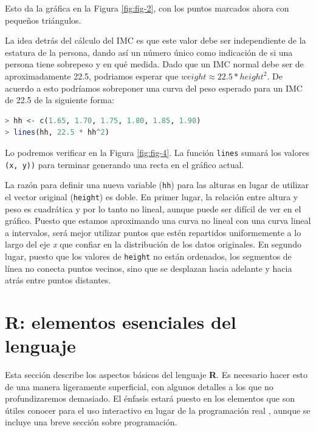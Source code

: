\documentclass[spanish]{extbook}
\numberwithin{equation}{section}
\numberwithin{figure}{section}
\begin{document}
Esto da la gráfica en la Figura \ref{fig:fig-2}, con los puntos marcados ahora
con pequeños triángulos.

La idea detrás del cálculo del IMC es que este valor debe ser independiente de
la estatura de la persona, dando así un número único como indicación de si una
persona tiene sobrepeso y en qué medida. Dado que un IMC normal debe ser de
aproximadamente 22.5, podriamos esperar que $weight \approx 22.5 * height^2$.
De acuerdo a esto podríamos sobreponer una curva del peso esperado para un IMC
de 22.5 de la siguiente forma:

\begin{lstlisting}[language=R]
> hh <- c(1.65, 1.70, 1.75, 1.80, 1.85, 1.90)
> lines(hh, 22.5 * hh^2)
\end{lstlisting}

Lo podremos verificar en la Figura \ref{fig:fig-4}. La función \texttt{lines}
sumará los valores \texttt{(x, y))} para terminar generando una recta en el
gráfico actual.

La razón para definir una nueva variable (\texttt{hh}) para las alturas en
lugar de utilizar el vector original (\texttt{height}) es doble. En primer
lugar, la relación entre altura y peso es cuadrática y por lo tanto no lineal,
aunque puede ser difícil de ver en el gráfico. Puesto que estamos aproximando
una curva no lineal con una curva lineal a intervalos, será mejor utilizar
puntos que estén repartidos uniformemente a lo largo del eje \textit{x} que
confiar en la distribución de los datos originales. En segundo lugar, puesto
que los valores de \texttt{height} no están ordenados, los segmentos de línea
no conecta puntos vecinos, sino que se desplazan hacia adelante y hacia atrás
entre puntos distantes.

\section{R: elementos esenciales del lenguaje}

Esta sección describe los aspectos básicos del lenguaje \textbf{R}. Es
necesario hacer esto de una manera ligeramente superficial, con algunos
detalles a los que no profundizaremos demasiado.  El énfasis estará puesto en los
elementos que son útiles conocer para el uso interactivo en lugar de la
programación real , aunque se incluye una breve sección sobre programación.
\end{document}
